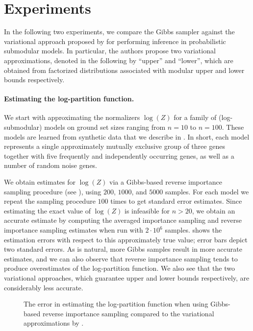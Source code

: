 \section{Experiments}
In the following two experiments, we compare the Gibbs sampler against the variational approach proposed by \cite{djolonga14} for performing inference in probabilistic submodular models.
In particular, the authors propose two variational approximations, denoted in the following by ``upper'' and ``lower'', which are obtained from factorized distributions associated with modular upper and lower bounds respectively.

\paragraph{Estimating the log-partition function.}
We start with approximating the normalizers $\log(Z)$ for a family of (log-submodular) \flid{} models on ground set sizes ranging from $n = 10$ to $n = 100$.
These \flid{} models are learned from synthetic data that we describe in .
In short, each model represents a single approximately mutually exclusive group of three genes together with five frequently and independently occurring genes, as well as a number of random noise genes.

We obtain estimates for $\log(Z)$ via a Gibbs-based reverse importance sampling procedure (see ), using $200$, $1000$, and $5000$ samples.
For each model we repeat the sampling procedure $100$ times to get standard error estimates.
Since estimating the exact value of $\log(Z)$ is infeasible for $n > 20$, we obtain an accurate estimate by computing the averaged importance sampling and reverse importance sampling estimates when run with $2\cdot 10^6$ samples.
 shows the estimation errors with respect to this approximately true value; error bars depict two standard errors.
As is natural, more Gibbs samples result in more accurate estimates, and we can also observe that reverse importance sampling tends to produce overestimates of the log-partition function.
We also see that the two variational approaches, which guarantee upper and lower bounds respectively, are considerably less accurate.

\setlength{}
\setlength{}
\renewcommand{\subflen}{\textwidth}
\begin{figure}[tb]
  \centering
  
  \caption{The error in estimating the log-partition function when using Gibbs-based reverse importance sampling compared to the variational approximations by \cite{djolonga14}.}
  \label{fig:gibbs_zest}
\end{figure}

